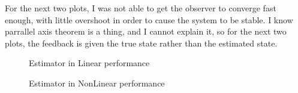 For the next two plots, I was not able to get the observer to converge fast enough, with little overshoot
in order to cause the system to be stable. I know parrallel axis theorem is a thing, and I cannot explain it,
so for the next two plots, the feedback is given the true state rather than the estimated state.
\begin{figure}[H]
  \begin{center}
  \end{center}
  \caption{Estimator in Linear performance}
  \label{fig:estimator-linear-with-k}
\end{figure}

\begin{figure}[H]
  \begin{center}
  \end{center}
  \caption{Estimator in NonLinear performance}
  \label{fig:estimator-nonlinear}
\end{figure}
